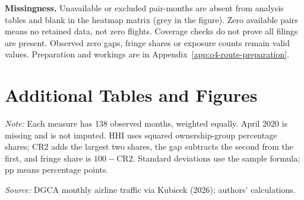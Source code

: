 \documentclass[12pt,a4paper]{article}
\begin{document}
\textbf{Missingness.} Unavailable or excluded pair-months are absent from analysis tables and blank in the heatmap matrix (grey in the figure). Zero available pairs means no retained data, not zero flights. Coverage checks do not prove all filings are present. Observed zero gaps, fringe shares or exposure counts remain valid values. Preparation and workings are in Appendix~\ref{app:o4-route-preparation}.


\clearpage
\section{Additional Tables and Figures}
\label{app:o4-national-summary}
\begin{minipage}{\linewidth}
\captionsetup{font=small,labelfont=bf,justification=raggedright,singlelinecheck=false,hypcap=false}
\label{tab:o4-national-summary}
\centering
{\small{}\par}
\vspace{4pt}
{\footnotesize{}\raggedright\textit{Note:} Each measure has 138 observed months, weighted equally. April 2020 is missing and is not imputed. HHI uses squared ownership-group percentage shares; CR2 adds the largest two shares, the gap subtracts the second from the first, and fringe share is $100-\mathrm{CR2}$. Standard deviations use the sample formula; pp means percentage points.\par
\textit{Source:} DGCA monthly airline traffic via Kubicek (2026); authors' calculations.\par}
\end{minipage}
\end{document}

